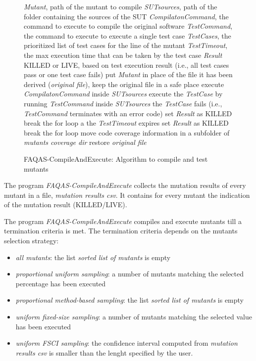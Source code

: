 \begin{figure}[h]
\begin{algorithmic}[1]
\scriptsize
\Require \emph{Mutant}, path of the mutant to compile
\Require \emph{SUTsources}, path of the folder containing the sources of the SUT
\Require \emph{CompilatonCommand}, the command to execute to compile the original software
\Require \emph{TestCommand}, the command to execute to execute a single test case
\Require \emph{TestCases}, the prioritized list of test cases for the line of the mutant
\Require \emph{TestTimeout}, the max execution time that can be taken by the test case
\Ensure \emph{Result} KILLED or LIVE, based on test execution result (i.e., all test cases pass or one test case fails)
\State put \emph{Mutant} in place of the file it has been derived (\emph{original file}), keep the original file in a safe place
\State execute  \emph{CompilatonCommand} inside \emph{SUTsources}
\State execute the \emph{TestCase} by running \emph{TestCommand} inside \emph{SUTsources}
\If the \emph{TestCase} fails (i.e., \emph{TestCommand} terminates with an error code)
\State set \emph{Result} as KILLED
\State break the for loop
\EndIf
\If a the \emph{TestTimeout} expires
\State set \emph{Result} as KILLED
\State break the for loop
\EndIf
\EndFor
\State move code coverage information in a subfolder of \emph{mutants coverage dir}
\State restore \emph{original file}
\end{algorithmic}
\caption{FAQAS-CompileAndExecute: Algorithm to compile and test mutants}
\label{alg:compileAndExecute}
\end{figure}

\RQ{} The program \emph{FAQAS-CompileAndExecute} collects the mutation results of every mutant in a file, \emph{mutation results csv}. It contains for every mutant the indication of the mutation result (KILLED/LIVE).

\RQ{} The program \emph{FAQAS-CompileAndExecute} compiles and execute mutants till a termination criteria is met. The termination criteria depends on the mutants selection strategy:
\begin{itemize}
\item \emph{all mutants}: the list \emph{sorted list of mutants} is empty
\item \emph{proportional uniform sampling}: a number of mutants matching the selected percentage has been executed
\item \emph{proportional method-based sampling}: the list \emph{sorted list of mutants} is empty
\item \emph{uniform fixed-size sampling}: a number of mutants matching the selected value has been executed
\item \emph{uniform FSCI sampling}: the confidence interval computed from \emph{mutation results csv} is smaller than the lenght specified by the user.
\end{itemize}

